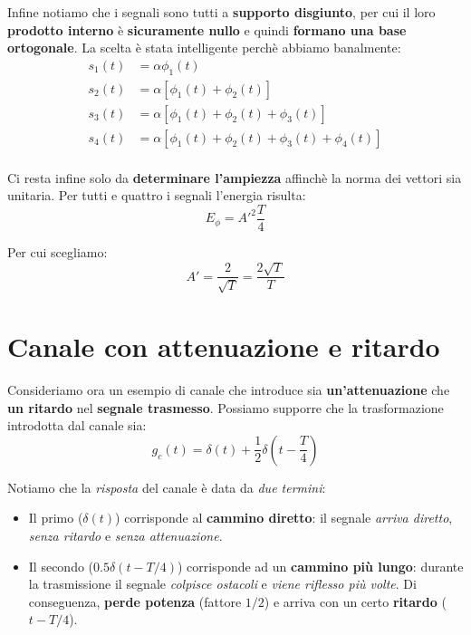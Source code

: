 Infine notiamo che i segnali sono tutti a \textbf{supporto disgiunto}, per cui il loro
\textbf{prodotto interno} è \textbf{sicuramente nullo} e quindi \textbf{formano una base ortogonale}. 
La scelta è stata intelligente perchè abbiamo banalmente:
\[
    \begin{aligned}
        s_{1}(t) &= \alpha \phi_{1}(t) \\ 
        s_{2}(t) &= \alpha \left[ \phi_{1}(t) + \phi_{2}(t) \right] \\ 
        s_{3}(t) &= \alpha \left[ \phi_{1}(t) + \phi_{2}(t) + \phi_{3}(t) \right] \\ 
        s_{4}(t) &= \alpha \left[ \phi_{1}(t) + \phi_{2}(t) + \phi_{3}(t) + \phi_{4}(t) \right] \\ 
    \end{aligned}
\]

Ci resta infine solo da \textbf{determinare l'ampiezza} affinchè la norma dei vettori 
sia unitaria. Per tutti e quattro i segnali l'energia risulta:
\[
    E_{\phi} = A'^2 \frac{T}{4}
\]

Per cui scegliamo:
\[
    A' = \frac{2}{\sqrt{T}} = \frac{2\sqrt{T}}{T}
\]

\section{Canale con attenuazione e ritardo}

Consideriamo ora un esempio di canale che introduce sia \textbf{un'attenuazione} che
\textbf{un ritardo} nel \textbf{segnale trasmesso}.
Possiamo supporre che la trasformazione introdotta dal canale sia:
\[
    g_c(t) = \delta(t) + \frac{1}{2}\delta \left( t - \frac{T}{4} \right)
\]

\begin{remark}
    Notiamo che la \textit{risposta} del canale è data da \textit{due termini}:
    \begin{itemize}
        \item Il primo ($\delta(t)$) corrisponde al \textbf{cammino diretto}: il segnale 
            \textit{arriva diretto}, \textit{senza ritardo} e \textit{senza attenuazione}.
        \item Il secondo ($0.5\delta(t - T/4)$) corrisponde ad un 
            \textbf{cammino più lungo}: durante la trasmissione il segnale 
            \textit{colpisce ostacoli} e \textit{viene riflesso più volte}.
            Di conseguenza, \textbf{perde potenza} (fattore $1/2$) e arriva con un
            certo \textbf{ritardo} ($t-T/4$).
    \end{itemize}
\end{remark}

